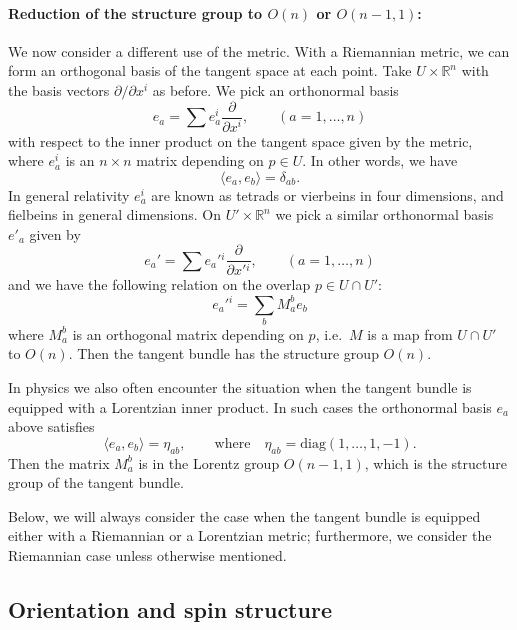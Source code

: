 \documentclass[12pt]{article}
\numberwithin{equation}{section}
\theoremstyle{remark}
\def\bR{\mathbb{R}}
\begin{document}
\paragraph{Reduction of the structure group to $O(n)$ or $O(n-1,1)$:}
We now consider a different use of the metric.
With a Riemannian metric, we can form an orthogonal basis of the tangent space at each point.
Take $U\times \bR^n$ with the basis vectors $\partial/\partial x^i$ as before.
We pick an orthonormal basis \begin{equation}
  e_a = \sum e_a^i \frac{\partial}{\partial x^i},
  \qquad (a=1,\ldots,n)
\end{equation} with respect to the inner product on the tangent space given by the metric,
where $e_a^i$ is an $n\times n$ matrix depending on $p\in U$.
In other words, we have \begin{equation}
\langle e_a, e_b \rangle = \delta_{ab}.
\end{equation}
In general relativity $e_a^i$ are known as tetrads or vierbeins 
in four dimensions, and fielbeins in general dimensions.
On $U'\times \bR^n$ we pick a similar orthonormal basis $e'_a$
given by \begin{equation}
  e_a' = \sum e_a'{}^i \frac{\partial}{\partial x'{}^i},
  \qquad (a=1,\ldots,n)
\end{equation}
and we have the following relation on the overlap $p\in U\cap U'$:  \begin{equation}
  e_a'{}^i = \sum_b M_a^b e_b
\end{equation} 
where $M_a^b$ is an orthogonal matrix depending on $p$,
i.e.~$M$ is a map from $U\cap U'$ to $O(n)$.
Then the tangent bundle has the structure group $O(n)$.

In physics we also often encounter the situation
when the tangent bundle is equipped with a Lorentzian inner product.
In such cases the orthonormal basis $e_a$ above satisfies
\begin{equation}
  \langle e_a, e_b \rangle = \eta_{ab},\qquad
  \text{where}
  \quad
  \eta_{ab} = \mathrm{diag}(1,\ldots,1,-1).
\end{equation}
Then the matrix $M_a^b$ is in the Lorentz group $O(n-1,1)$,
which is the structure group of the tangent bundle.

Below, we will always consider the case when the tangent bundle is
equipped either with a Riemannian or a Lorentzian metric;
furthermore, we consider the Riemannian case unless otherwise mentioned.

\subsection{Orientation and spin structure}
\end{document}
